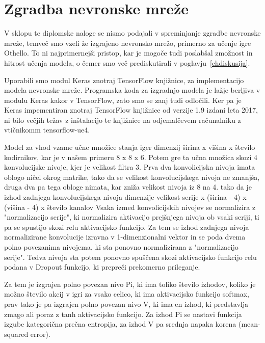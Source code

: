 \documentclass[a4paper, 12pt]{book}
\begin{document}
\section{Zgradba nevronske mreže}

V sklopu te diplomske naloge se nismo podajali v spreminjanje zgradbe nevronske mreže, temveč smo vzeli že izgrajeno nevronsko mrežo, primerno za učenje igre Othello.
To ni najprimernejši pristop, kar je mogoče tudi poslabšal zmožnost in hitrost učenja modela, o čemer smo več prediskutirali v poglavju~\ref{chdiskusija}.

Uporabili smo modul Keras znotraj TensorFlow knjižnice, za implementacijo modela nevronske mreže.
Programska koda za izgradnjo modela je lažje berljiva v modulu Keras kakor v TensorFlow, zato smo se zanj tudi odločili.
Ker pa je Keras impementiran znotraj TensorFlow knjižnice od verzije 1.9 izdani leta 2017, ni bilo večjih težav z inštalacijo te knjižnice na odjemalčevem računalniku z vtičnikomm tensorflow-ue4.

Model za vhod vzame učne množice stanja iger dimenzij širina x višina x število kodirnikov, kar je v našem primeru 8 x 8 x 6.
Potem gre ta učna množica skozi 4 konvolucijske nivoje, kjer je velikost filtra 3.
Prva dva konvolicijska nivoja imata oblogo ničel okrog matrike, tako da se velikost konvolucijskega nivoja ne zmanjša, druga dva pa tega obloge nimata, kar zniža velikost nivoja iz 8 na 4.
tako da je izhod zadnjega konvolucijskega nivoja dimenzije velikost serije  x (širina - 4) x (višina - 4) x število kanalov
Vsaka izmed konvolicijskih nivojev se normalizira z "normalizacijo serije", ki normalizira aktivacijo prejšnjega nivoja ob vsaki seriji, ti pa se spustijo skozi relu aktivacijsko funkcijo.
Za tem se izhod zadnjega nivoja normalizirane konvolucije izravna v 1-dimenzionalni vektor in se poda dvema polno povezanima nivojema, ki sta ponovno normalizirana z "normalizacijo serije".
Tedva nivoja sta potem ponovno spuščena skozi aktivacijsko funkcijo relu podana v  Dropout funkcijo, ki prepreči prekomerno prileganje.

Za tem je izgrajen polno povezan nivo Pi, ki ima toliko število izhodov, koliko je možno število akcij v igri za vsako celico, ki ima aktivacijsko funkcijo softmax,
prav tako je pa izgrajen polno povezan nivo V, ki ima en izhod, ki predstavlja zmago ali poraz z tanh aktivacijsko funkcijo.
Za izhod Pi se nastavi funkcija izgube kategorična prečna entropija, za izhod V pa srednja napaka korena (mean-squared error).
\end{document}
